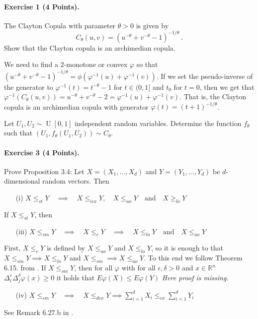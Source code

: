 \documentclass{article}
\begin{document}
\paragraph{Exercise 1 \textnormal{(4 Points)}.}
The Clayton Copula with parameter $\theta>0$ is given by
\[
C_\theta(u,v)=(u^{-\theta}+v^{-\theta}-1)^{-1/\theta}\,.
\]
Show that the Clayton copula is an archimedian copula.

We need to find a 2-monotone or convex $\varphi$ so that $(u^{-\theta}+v^{-\theta}-1)^{-1/\theta}=\phi(\varphi^{-1}(u)+\varphi^{-1}(v))$.
If we set the pseudo-inverse of the generator to $\varphi^{-1}(t)=t^{-\theta}-1$ for $t\in(0,1]$ and $t_0$ for $t=0$, then we get that $\varphi^{-1}(C_\theta(u,v))=u^{-\theta}+v^{-\theta}-2=\varphi^{-1}(u)+\varphi^{-1}(v)$.
That is, the Clayton copula is an archimedian copula with generator $\varphi(t)=(t+1)^{-1/\theta}$.

Let $U_1,U_2\sim\operatorname{U}[0,1]$ independent random variables.
Determine the function $f_\theta$ such that $(U_1,f_\theta(U_1,U_2))\sim C_\theta$.

\paragraph{Exercise 3 \textnormal{(4 Points)}.}
Prove Proposition 3.4:
Let $X=(X_1,\dots,X_d)$ and $Y=(Y_1,\dots,Y_d)$ be $d$-dimensional random vectors.
Then
\begin{itemize}
\item [(i)] $X\leq_{st} Y\quad\implies\quad X\leq_{icx}Y,\quad X\leq_{uo}Y\quad\text{and}\quad X\geq_{lo}Y$
\end{itemize}
If $X\leq_{st}Y$, then
\begin{itemize}
\item [(iii)] $X\leq_{sm}Y \quad\implies\quad X\leq_c Y\quad\implies\quad X\leq_{lo}Y\quad\text{and}\quad X\leq_{uo}Y$
\end{itemize}

First, $X\leq_c Y$ is defined by $X\leq_{uo}Y$ and $X\leq_{lo}Y$, so it is enough to that $X\leq_{sm}Y\implies X\leq_{lo}Y$ and $X\leq_{sm}\implies X\leq_{uo}Y$.
To this end we follow Theorem 6.15. from \cite{ruschendorf2013mathematical}.
If $X\leq_{sm}Y$, then for all $\varphi$ with for all $\epsilon,\delta>0$ and $x\in\mathbb{R}^n$ $\Delta^\varepsilon_i\Delta^\delta_j\varphi(x)\geq0$ it holds that $E\varphi(X)\leq E\varphi(Y)$
\emph{Here proof is missing.}

\begin{itemize}
\item [(iv)] $X\leq_{sm}Y\quad\implies\quad X\leq_{dcx}Y\implies\sum_{i=1}^dX_i\leq_{cx}\sum_{i=1}^dY_i$
\end{itemize}
See Remark 6.27.b in \cite{ruschendorf2013mathematical}.
\end{document}
